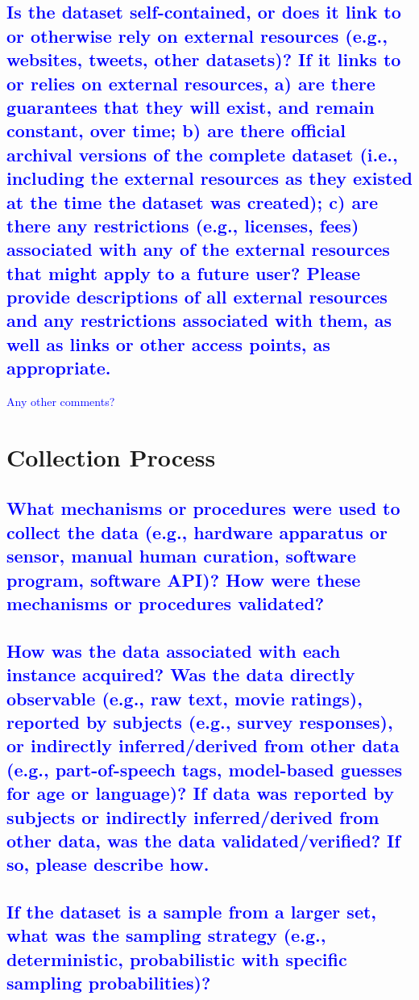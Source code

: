 \documentclass[letterpaper, 10 pt, conference]{ieeeconf}  %
\begin{document}
\textcolor{blue}{\subsection{Is the dataset self-contained, or does it link to or otherwise rely on
external resources (e.g., websites, tweets, other datasets)? If it links
to or relies on external resources, a) are there guarantees that they will
exist, and remain constant, over time; b) are there official archival versions
of the complete dataset (i.e., including the external resources as they existed at the time the dataset was created); c) are there any restrictions
(e.g., licenses, fees) associated with any of the external resources that
might apply to a future user? Please provide descriptions of all external
resources and any restrictions associated with them, as well as links or
other access points, as appropriate.}}
\lipsum[1]

\textcolor{blue}{Any other comments?}
\lipsum[1]

\section{Collection Process}

\textcolor{blue}{\subsection{What mechanisms or procedures were used to collect the data (e.g.,
hardware apparatus or sensor, manual human curation, software program, software API)? How were these mechanisms or procedures validated?}}
\lipsum[1]

\textcolor{blue}{\subsection{How was the data associated with each instance acquired? Was the
data directly observable (e.g., raw text, movie ratings), reported by subjects (e.g., survey responses), or indirectly inferred/derived from other data
(e.g., part-of-speech tags, model-based guesses for age or language)?
If data was reported by subjects or indirectly inferred/derived from other
data, was the data validated/verified? If so, please describe how.}}
\lipsum[1]

\textcolor{blue}{\subsection{If the dataset is a sample from a larger set, what was the sampling strategy (e.g., deterministic, probabilistic with specific sampling probabilities)?}}
\lipsum[1]
\end{document}
